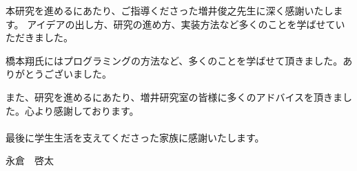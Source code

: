 \begin{acknowledgment}
本研究を進めるにあたり、ご指導くださった増井俊之先生に深く感謝いたします。
アイデアの出し方、研究の進め方、実装方法など多くのことを学ばせていただきました。

橋本翔氏にはプログラミングの方法など、多くのことを学ばせて頂きました。ありがとうございました。

また、研究を進めるにあたり、増井研究室の皆様に多くのアドバイスを頂きました。心より感謝しております。\\\\
最後に学生生活を支えてくださった家族に感謝いたします。

\begin{flushright}
永倉　啓太
\end{flushright}

\end{acknowledgment}
